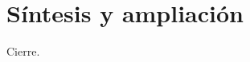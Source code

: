 \documentclass[a4paper]{article}
\newcommand{\videocoverpath}{}
\begin{document}
\section{Síntesis y ampliación}
Cierre.




\end{document}
